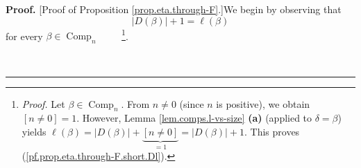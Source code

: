 \documentclass[numbers=enddot,12pt,final,onecolumn,notitlepage]{scrartcl}%
\theoremstyle{definition}
\newenvironment{proof}[1][Proof]{\noindent\textbf{#1.} }{\ \rule{0.5em}{0.5em}}
\newenvironment{vershort}{}{}
\begin{document}
\begin{vershort}


\begin{proof}
[Proof of Proposition \ref{prop.eta.through-F}.]We begin by observing that%
\begin{equation}
\left\vert D\left(  \beta\right)  \right\vert +1=\ell\left(  \beta\right)
\label{pf.prop.eta.through-F.short.Dl}%
\end{equation}
for every $\beta\in\operatorname*{Comp}\nolimits_{n}$%
\ \ \ \ \footnote{\textit{Proof.} Let $\beta\in\operatorname*{Comp}%
\nolimits_{n}$. From $n\neq0$ (since $n$ is positive), we obtain $\left[
n\neq0\right]  =1$. However, Lemma \ref{lem.comps.l-vs-size} \textbf{(a)}
(applied to $\delta=\beta$) yields $\ell\left(  \beta\right)  =\left\vert
D\left(  \beta\right)  \right\vert +\underbrace{\left[  n\neq0\right]  }%
_{=1}=\left\vert D\left(  \beta\right)  \right\vert +1$. This proves
(\ref{pf.prop.eta.through-F.short.Dl}).}.


\end{proof}
\end{vershort}
\end{document}
